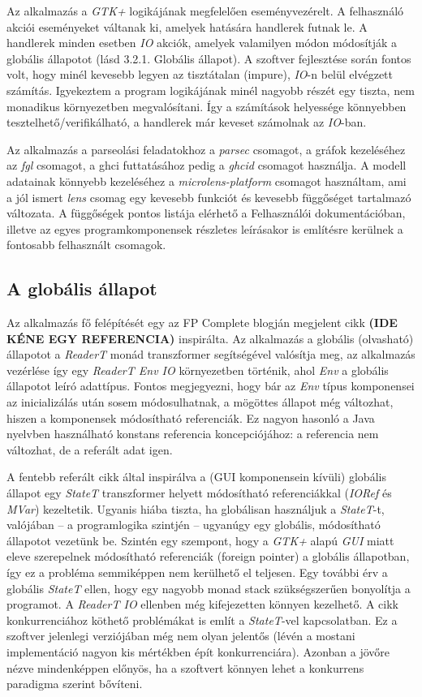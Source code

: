 Az alkalmazás a \textit{GTK+} logikájának megfelelően eseményvezérelt. A felhasználó akciói eseményeket váltanak ki, amelyek hatására handlerek futnak le. A handlerek minden esetben \textit{IO} akciók, amelyek valamilyen módon módosítják a globális állapotot (lásd 3.2.1. Globális állapot). A szoftver fejlesztése során fontos volt, hogy minél kevesebb legyen az tisztátalan (impure), \textit{IO}-n belül elvégzett számítás. Igyekeztem a program logikájának minél nagyobb részét egy tiszta, nem monadikus környezetben megvalósítani. Így a számítások helyessége könnyebben tesztelhető/verifikálható, a handlerek már keveset számolnak az \textit{IO}-ban.

Az alkalmazás a parseolási feladatokhoz a \textit{parsec} csomagot, a gráfok kezeléséhez az \textit{fgl} csomagot, a ghci futtatásához pedig a \textit{ghcid} csomagot használja. A modell adatainak könnyebb kezeléséhez a \textit{microlens-platform} csomagot használtam, ami a jól ismert \textit{lens} csomag egy kevesebb funkciót és kevesebb függőséget tartalmazó változata. A függőségek pontos listája elérhető a Felhasználói dokumentációban, illetve az egyes programkomponensek részletes leírásakor is említésre kerülnek a fontosabb felhasznált csomagok.

\subsection{A globális állapot}

Az alkalmazás fő felépítését egy az FP Complete blogján megjelent cikk \textbf{(IDE KÉNE EGY REFERENCIA)} inspirálta. 
Az alkalmazás a globális (olvasható) állapotot a \textit{ReaderT} monád transzformer segítségével valósítja meg, az alkalmazás vezérlése így egy \textit{ReaderT Env IO} környezetben történik, ahol \textit{Env} a globális állapotot leíró adattípus. Fontos megjegyezni, hogy bár az \textit{Env} típus komponensei az inicializálás után sosem módosulhatnak, a mögöttes állapot még változhat, hiszen a komponensek módosítható referenciák. Ez nagyon hasonló a Java nyelvben használható konstans referencia koncepciójához: a referencia nem változhat, de a referált adat igen.

A fentebb referált cikk által inspirálva a (GUI komponensein kívüli) globális állapot egy \textit{StateT} transzformer helyett módosítható referenciákkal (\textit{IORef} és \textit{MVar}) kezeltetik. Ugyanis hiába tiszta, ha globálisan használjuk a \textit{StateT}-t, valójában -- a programlogika szintjén -- ugyanúgy egy globális, módosítható állapotot vezetünk be. Szintén egy szempont, hogy a \textit{GTK+} alapú \textit{GUI} miatt eleve szerepelnek módosítható referenciák (foreign pointer) a globális állapotban, így ez a probléma semmiképpen nem kerülhető el teljesen. Egy további érv a globális \textit{StateT} ellen, hogy egy nagyobb monad stack szükségszerűen bonyolítja a programot. A \textit{ReaderT IO} ellenben még kifejezetten könnyen kezelhető. A cikk konkurrenciához köthető problémákat is említ a \textit{StateT}-vel kapcsolatban. Ez a szoftver jelenlegi verziójában még nem olyan jelentős (lévén a mostani implementáció nagyon kis mértékben épít konkurrenciára). Azonban a jövőre nézve mindenképpen előnyös, ha a szoftvert könnyen lehet a konkurrens paradigma szerint bővíteni.

